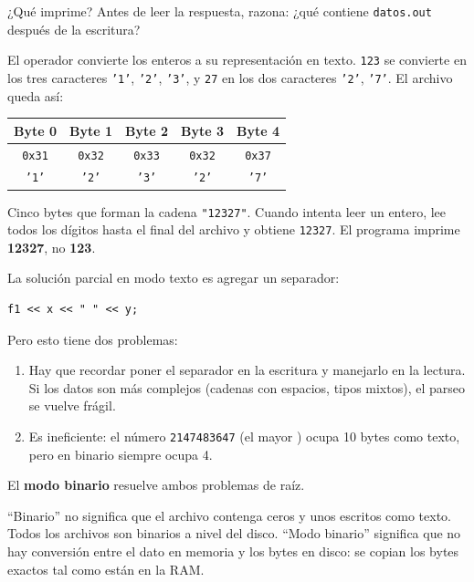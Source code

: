 \documentclass[12pt, oneside]{article}
\begin{document}
¿Qué imprime?  Antes de leer la respuesta, razona: ¿qué contiene
\texttt{datos.out} después de la escritura?

El operador \cpp{<<} convierte los enteros a su representación en texto.
\texttt{123} se convierte en los tres caracteres \texttt{'1'}, \texttt{'2'},
\texttt{'3'}, y \texttt{27} en los dos caracteres \texttt{'2'},
\texttt{'7'}.  El archivo queda así:

\begin{center}
\begin{tabular}{ccccc}
  \toprule
  Byte 0 & Byte 1 & Byte 2 & Byte 3 & Byte 4 \\
  \midrule
  \texttt{0x31} & \texttt{0x32} & \texttt{0x33} & \texttt{0x32} & \texttt{0x37} \\
  \texttt{'1'}  & \texttt{'2'}  & \texttt{'3'}  & \texttt{'2'}  & \texttt{'7'} \\
  \bottomrule
\end{tabular}
\end{center}

Cinco bytes que forman la cadena \texttt{"12327"}.  Cuando 
intenta leer un entero, lee todos los dígitos hasta el final del archivo y
obtiene \texttt{12327}.  El programa imprime \textbf{12327}, no \textbf{123}.

La solución parcial en modo texto es agregar un separador:
\begin{verbatim}
f1 << x << " " << y;
\end{verbatim}

Pero esto tiene dos problemas:

\begin{enumerate}
  \item Hay que recordar poner el separador en la escritura y manejarlo en
        la lectura.  Si los datos son más complejos (cadenas con espacios,
        tipos mixtos), el parseo se vuelve frágil.
  \item Es ineficiente: el número \texttt{2147483647} (el mayor )
        ocupa 10 bytes como texto, pero en binario siempre ocupa 4.
\end{enumerate}

El \textbf{modo binario} resuelve ambos problemas de raíz.

\begin{recuerda}
  ``Binario'' no significa que el archivo contenga ceros y unos escritos
  como texto.  Todos los archivos son binarios a nivel del disco.
  ``Modo binario'' significa que no hay conversión entre el dato en memoria
  y los bytes en disco: se copian los bytes exactos tal como están en la
  RAM.
\end{recuerda}
\end{document}
